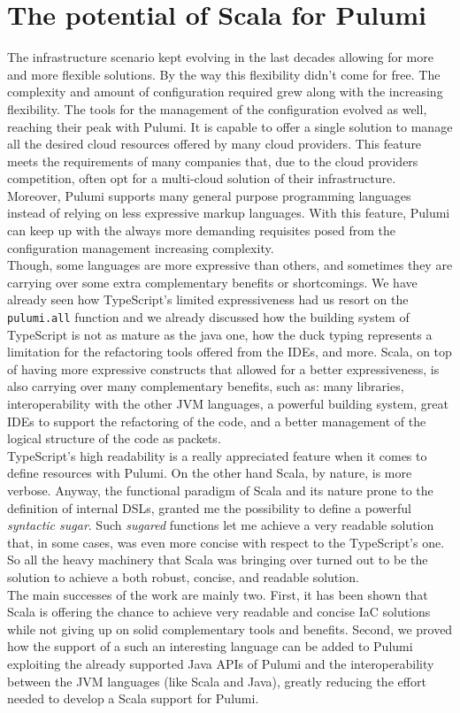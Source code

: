 \section{The potential of Scala for Pulumi}
The infrastructure scenario kept evolving in the last decades allowing for more and more flexible solutions.
By the way this flexibility didn't come for free.
The complexity and amount of configuration required grew along with the increasing flexibility.
The tools for the management of the configuration evolved as well, reaching their peak with Pulumi.
It is capable to offer a single solution to manage all the desired cloud resources offered by many cloud providers.
This feature meets the requirements of many companies that, due to the cloud providers competition, often opt for a multi-cloud solution of their infrastructure.
Moreover, Pulumi supports many general purpose programming languages instead of relying on less expressive markup languages.
With this feature, Pulumi can keep up with the always more demanding requisites posed from the configuration management increasing complexity.\\
Though, some languages are more expressive than others, and sometimes they are carrying over some extra complementary benefits or shortcomings.
We have already seen how TypeScript's limited expressiveness had us resort on the \texttt{pulumi.all} function and we already discussed how the building system of TypeScript is not as mature as the java one, how the duck typing represents a limitation for the refactoring tools offered from the IDEs, and more.
Scala, on top of having more expressive constructs that allowed for a better expressiveness, is also carrying over many complementary benefits, such as: many libraries, interoperability with the other JVM languages, a powerful building system, great IDEs to support the refactoring of the code, and a better management of the logical structure of the code as packets.\\
TypeScript's high readability is a really appreciated feature when it comes to define resources with Pulumi.
On the other hand Scala, by nature, is more verbose.
Anyway, the functional paradigm of Scala and its nature prone to the definition of internal DSLs, granted me the possibility to define a powerful \textit{syntactic sugar}.
Such \textit{sugared} functions let me achieve a very readable solution that, in some cases, was even more concise with respect to the TypeScript's one.\\
So all the heavy machinery that Scala was bringing over turned out to be the solution to achieve a both robust, concise, and readable solution.\\
The main successes of the work are mainly two.
First, it has been shown that Scala is offering the chance to achieve very readable and concise IaC solutions while not giving up on solid complementary tools and benefits.
Second, we proved how the support of a such an interesting language can be added to Pulumi exploiting the already supported Java APIs of Pulumi and the interoperability between the JVM languages (like Scala and Java), greatly reducing the effort needed to develop a Scala support for Pulumi.


